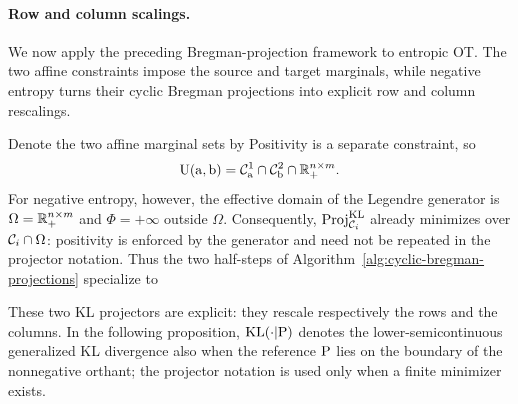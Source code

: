 \paragraph{Row and column scalings.}

We now apply the preceding Bregman-projection framework to entropic OT\@. The two affine constraints impose the source and target marginals, while negative entropy turns their cyclic Bregman projections into explicit row and column rescalings.

Denote the two affine marginal sets by
Positivity is a separate constraint, so
\[
	\CouplingsD(\a,\b)
	=
	\Cc^1_\a\cap\Cc^2_\b\cap\RR_+^{n\times m}.
\]
For negative entropy, however, the effective domain of the Legendre generator is $\Omega=\RR_+^{n\times m}$ and $\Phi=+\infty$ outside $\Omega$. Consequently, $\Proj_{\Cc_i}^{\KLD}$ already minimizes over $\Cc_i\cap\Omega$: positivity is enforced by the generator and need not be repeated in the projector notation. Thus the two half-steps of Algorithm~\ref{alg:cyclic-bregman-projections} specialize to

These two KL projectors are explicit: they rescale respectively the rows and the columns. In the following proposition, $\KLD(\cdot|\P)$ denotes the lower-semicontinuous generalized KL divergence also when the reference $\P$ lies on the boundary of the nonnegative orthant; the projector notation is used only when a finite minimizer exists.


